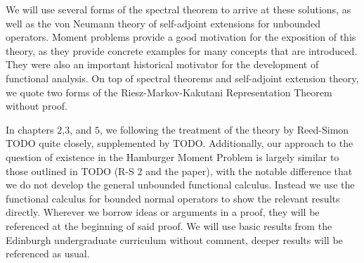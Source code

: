 \documentclass[12pt,oneside]{report}
\begin{document}
We will use several forms of the spectral theorem to arrive at these solutions, as well as the von Neumann theory of self-adjoint extensions for unbounded operators. Moment problems provide a good motivation for the exposition of this theory, as they provide concrete examples for many concepts that are introduced. They were also an important historical motivator for the development of functional analysis. On top of spectral theorems and self-adjoint extension theory, we quote two forms of the Riesz-Markov-Kakutani Representation Theorem without proof.

In chapters $2$,$3$, and $5$, we following the treatment of the theory by Reed-Simon TODO quite closely, supplemented by TODO. Additionally, our approach to the question of existence in the Hamburger Moment Problem is largely similar to those outlined in TODO (R-S 2 and the paper), with the notable difference that we do not develop the general unbounded functional calculus. Instead we use the functional calculus for bounded normal operators to show the relevant results directly. Wherever we borrow ideas or arguments in a proof, they will be referenced at the beginning of said proof. We will use basic results from the Edinburgh undergraduate curriculum without comment, deeper results will be referenced as usual.


\end{document}
